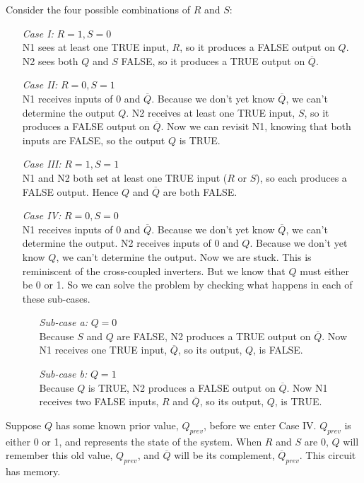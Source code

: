 \documentclass[12pt]{article}
\theoremstyle{definition}
\begin{document}
  Consider the four possible combinations of $R$ and $S$:
  \begin{itemize}
    \item[\emph{Case I:}] $R = 1, S = 0$ \\
    N1 sees at least one TRUE input, $R$, so it produces a FALSE output on $Q$.
    N2 sees both $Q$ and $S$ FALSE, so it produces a TRUE output on $\overline{Q}$.
    \item[\emph{Case II:}] $R = 0, S = 1$ \\
    N1 receives inputs of 0 and $\overline{Q}$.
    Because we don't yet know $\overline{Q}$, we can't determine the output $Q$.
    N2 receives at least one TRUE input, $S$, so it produces a FALSE output on $\overline{Q}$.
    Now we can revisit N1, knowing that both inputs are FALSE, so the output $Q$ is TRUE.
    \item[\emph{Case III:}] $R = 1, S = 1$ \\
    N1 and N2 both set at least one TRUE input ($R$ or $S$), so each produces a FALSE output.
    Hence $Q$ and $\overline{Q}$ are both FALSE.
    \item[\emph{Case IV:}] $R = 0, S = 0$ \\
    N1 receives inputs of 0 and $\overline{Q}$.
    Because we don't yet know $\overline{Q}$, we can't determine the output.
    N2 receives inputs of 0 and $Q$.
    Because we don't yet know $Q$, we can't determine the output.
    Now we are stuck.
    This is reminiscent of the cross-coupled inverters.
    But we know that $Q$ must either be 0 or 1.
    So we can solve the problem by checking what happens in each of these sub-cases.
    \begin{itemize}
      \item[\emph{Sub-case a:}] $Q = 0$ \\
      Because $S$ and $Q$ are FALSE, N2 produces a TRUE output on $\overline{Q}$. Now N1 receives one TRUE input, $\overline{Q}$, so its output, $Q$, is FALSE.
      \item[\emph{Sub-case b:}] $Q = 1$ \\
      Because $Q$ is TRUE, N2 produces a FALSE output on $\overline{Q}$. Now N1 receives two FALSE inputs, $R$ and $\overline{Q}$, so its output, $Q$, is TRUE.
    \end{itemize}
  \end{itemize}

  Suppose $Q$ has some known prior value, $Q_{prev}$, before we enter Case IV. $Q_{prev}$ is either 0 or 1, and represents the state of the system.
  When $R$ and $S$ are 0, $Q$ will remember this old value, $Q_{prev}$, and $\overline{Q}$ will be its complement, $\overline{Q}_{prev}$.
  This circuit has memory. \\
\end{document}
